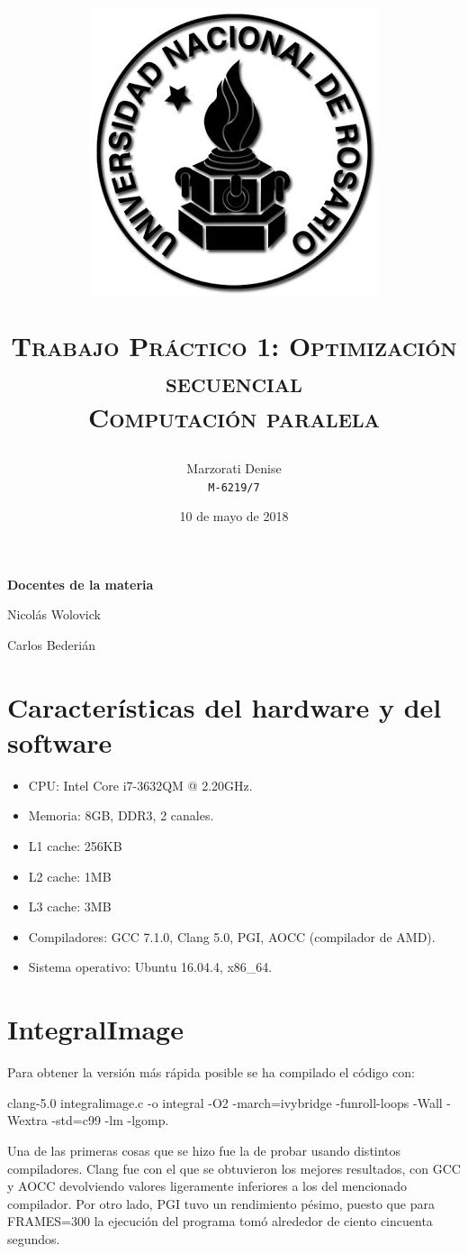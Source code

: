 \documentclass[a4paper,10pt]{article}
\author{
    Marzorati Denise \\
    \texttt{M-6219/7}
}
\date{
    10 de mayo de 2018
}
\title{
    \begin{center}
\includegraphics[scale=1]{logo-unr.png}
\end{center}
\Huge \textsc{{\bfseries T}rabajo {\bfseries P}ráctico 1: Optimización secuencial} \\
    \large \textsc{Computación paralela} \\
}
\begin{document}
\bigskip
\bigskip
\bigskip

\maketitle

\thispagestyle{empty}

\begin{center}
\large \bf Docentes de la materia
\end{center}

\begin{center}
Nicolás Wolovick

Carlos Bederián
\end{center}

\newpage{}
\normalsize

\section*{Características del hardware y del software}

\begin{itemize}
  \item CPU: Intel Core i7-3632QM @ 2.20GHz.
  \item Memoria: 8GB, DDR3, 2 canales. 
  \item L1 cache: 256KB
  \item L2 cache: 1MB
  \item L3 cache: 3MB
  \item Compiladores: GCC 7.1.0, Clang 5.0, PGI, AOCC (compilador de AMD).
  \item Sistema operativo: Ubuntu 16.04.4, x86\_64.
\end{itemize}

\newpage{}
\section*{IntegralImage}

Para obtener la versión más rápida posible se ha compilado el código con:

clang-5.0 integralimage.c -o integral -O2 -march=ivybridge -funroll-loops -Wall -Wextra -std=c99 -lm -lgomp.

Una de las primeras cosas que se hizo fue la de probar usando distintos compiladores. Clang fue
con el que se obtuvieron los mejores resultados, con GCC y AOCC devolviendo valores ligeramente
inferiores a los del mencionado compilador. Por otro lado, PGI tuvo un rendimiento pésimo,
puesto que para FRAMES=300 la ejecución del programa tomó alrededor de ciento cincuenta segundos.
\end{document}
